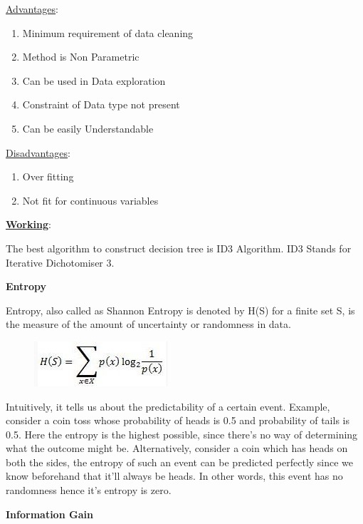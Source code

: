    \underline{Advantages}:
   
   \begin{enumerate}
       \item Minimum requirement of data cleaning
       \item Method is Non Parametric
       \item Can be used in Data exploration
       \item Constraint of Data type not present
       \item Can be easily Understandable
   \end{enumerate}
   
  \underline{Disadvantages}:
  
  \begin{enumerate}
      \item Over fitting
      \item Not fit for continuous variables
  \end{enumerate}
    
   \textbf{\underline{Working}}:
    
    The best algorithm to construct decision tree  is ID3 Algorithm. ID3 Stands for Iterative Dichotomiser 3.
    
    \textbf{Entropy}
    
    Entropy, also called as Shannon Entropy is denoted by H(S) for a finite set S, is the measure of the amount of uncertainty or randomness in data.
    
    
    \begin{figure}[h!]
        \centering
        \includegraphics[scale=0.8]{Figures/a1.png}
    \end{figure}
   
   Intuitively, it tells us about the predictability of a certain event. Example, consider a coin toss whose probability of heads is 0.5 and probability of tails is 0.5. Here the entropy is the highest possible, since there’s no way of determining what the outcome might be. Alternatively, consider a coin which has heads on both the sides, the entropy of such an event can be predicted perfectly since we know beforehand that it’ll always be heads. In other words, this event has no randomness hence it’s entropy is zero.
   
   \textbf{Information Gain}

